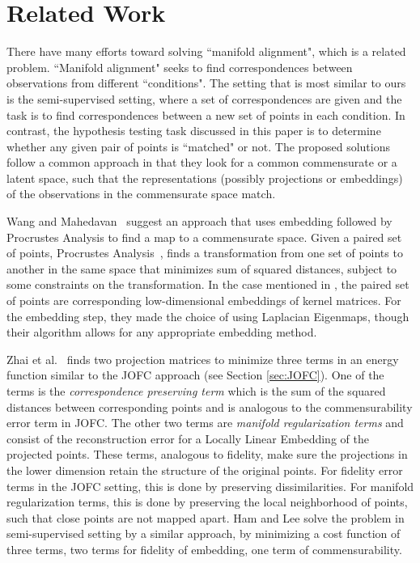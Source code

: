 \documentclass[11pt]{article} %
\begin{document}
\section{Related Work \label{sec:RelatedWork}}
There have many efforts toward solving ``manifold alignment", which is a related  problem. ``Manifold alignment" seeks to find correspondences between observations from different ``conditions". The setting that is most similar to ours is the semi-supervised setting, where a set of correspondences are given and the task is to find correspondences between a new set of points in each condition. In contrast, the hypothesis testing task discussed in this paper is to determine whether any given pair of points is ``matched" or not. The proposed solutions follow a common approach in that they look for a common commensurate or a latent space, such that the representations (possibly projections or embeddings) of the observations in the commensurate space match.

Wang and Mahedavan~\cite{Wang2008} suggest an  approach that uses embedding followed by Procrustes Analysis to find a map to a commensurate space. Given a paired set of points, Procrustes Analysis~\cite{Sibson}, finds a transformation from one set of points to another in the same space that minimizes sum of squared distances, subject to some constraints on the transformation. In the case mentioned in \cite{Wang2008}, the paired set of points are corresponding low-dimensional embeddings of kernel matrices.   For the embedding step, they made the choice of using Laplacian Eigenmaps, though their algorithm allows for any appropriate embedding method.

 Zhai et al.~\cite{Zhai2010}  finds two projection matrices to minimize three terms in an energy function similar to the  JOFC approach (see Section \ref{sec:JOFC}). One of the terms is the \emph{correspondence preserving term} which is the sum of the squared distances between corresponding points and is analogous to the commensurability error term in JOFC. The other two terms are \emph{manifold regularization terms} and consist of the reconstruction error for a Locally Linear Embedding of the projected points. These terms, analogous to fidelity, make sure the projections in the lower dimension retain the structure of the original points. For fidelity error terms in the JOFC setting, this is done by preserving dissimilarities. For manifold regularization terms, this is done by preserving the local neighborhood of points, such that close points are not mapped apart.
Ham and Lee solve the problem in semi-supervised setting by a similar approach, by minimizing a cost function of three terms, two terms for fidelity of embedding, one term of commensurability.
\end{document}
